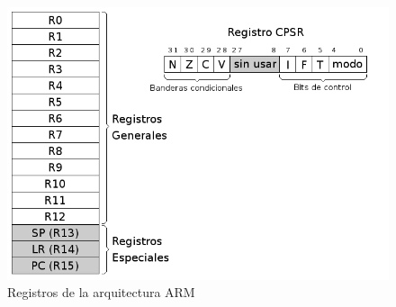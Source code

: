 \begin{figure}[h]
  \centering
    \includegraphics[width=14cm]{graphs/registros.png}
  \caption{Registros de la arquitectura ARM}
  \label{fig:reg_arm}
\end{figure}

